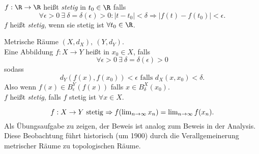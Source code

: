 \begin{remark}
  $ f: \R \to \R $ heißt \emph{stetig} in $ t_0 \in \R $ falls
  \begin{equation*}
    \forall \epsilon > 0 \ \exists \ \delta = \delta(\epsilon) > 0 : \vert t - t_0 \vert < \delta \Rightarrow \vert f(t)-f(t_0) \vert < \epsilon\text{.}
  \end{equation*}
  $ f $ heißt \emph{stetig}, wenn sie stetig ist $ \forall t_0 \in \R $.
\end{remark}

\begin{remark}
  Metrische Räume $ (X, d_X), \ (Y, d_Y) $. \\
  Eine Abbildung $ f: X \to Y $ heißt  in $ x_0 \in X $, falls
  \begin{equation*}
    \forall \epsilon > 0 \ \exists \ \delta = \delta(\epsilon) > 0
  \end{equation*}
  sodass
  \begin{equation*}
    d_Y(f(x), f(x_0)) < \epsilon \text{ falls } d_X(x, x_0) < \delta\text{.}
  \end{equation*}
  Also wenn $ f(x) \in B_\epsilon^Y(f(x)) $ falls $ x \in B_\delta^X(x_0) $. \\
  $ f $ heißt \emph{stetig}, falls $ f $ stetig ist $ \forall x \in X $.
\end{remark}

\begin{remark}
  \begin{equation*}
    f: X \to Y $ stetig $ \Rightarrow f(\lim_{n \to \infty}x_n) = \lim_{n \to \infty}f(x_n)\text{.}
  \end{equation*}
  Als Übungsaufgabe zu zeigen, der Beweis ist analog zum Beweis in der Analysis. \\
  Diese Beobachtung führt historisch (um 1900) durch die Verallgemeinerung metrischer Räume zu topologischen Räume.
\end{remark}